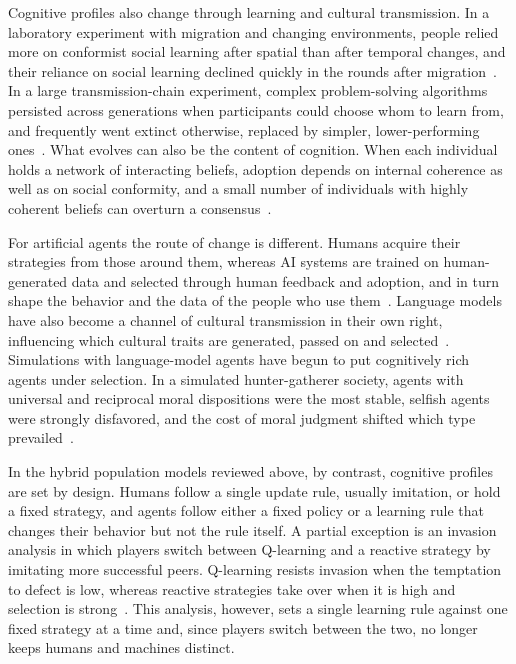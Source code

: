 Cognitive profiles also change through learning and cultural transmission. In a laboratory experiment with migration and changing environments, people relied more on conformist social learning after spatial than after temporal changes, and their reliance on social learning declined quickly in the rounds after migration~\cite{deffnerDynamicSocialLearning2020}. In a large transmission-chain experiment, complex problem-solving algorithms persisted across generations when participants could choose whom to learn from, and frequently went extinct otherwise, replaced by simpler, lower-performing ones~\cite{thompsonComplexCognitiveAlgorithms2022}. What evolves can also be the content of cognition. When each individual holds a network of interacting beliefs, adoption depends on internal coherence as well as on social conformity, and a small number of individuals with highly coherent beliefs can overturn a consensus~\cite{rodriguezCollectiveDynamicsBelief2016}.

For artificial agents the route of change is different. Humans acquire their strategies from those around them, whereas AI systems are trained on human-generated data and selected through human feedback and adoption, and in turn shape the behavior and the data of the people who use them~\cite{hanSocialPhysicsAge2026, pedreschiHumanAICoevolution2025}. Language models have also become a channel of cultural transmission in their own right, influencing which cultural traits are generated, passed on and selected~\cite{hanSocialPhysicsAge2026}. Simulations with language-model agents have begun to put cognitively rich agents under selection. In a simulated hunter-gatherer society, agents with universal and reciprocal moral dispositions were the most stable, selfish agents were strongly disfavored, and the cost of moral judgment shifted which type prevailed~\cite{zihengWhyAreWe2025}.

In the hybrid population models reviewed above, by contrast, cognitive profiles are set by design. Humans follow a single update rule, usually imitation, or hold a fixed strategy, and agents follow either a fixed policy or a learning rule that changes their behavior but not the rule itself. A partial exception is an invasion analysis in which players switch between Q-learning and a reactive strategy by imitating more successful peers. Q-learning resists invasion when the temptation to defect is low, whereas reactive strategies take over when it is high and selection is strong~\cite{quanHumanMachineCooperation2026}. This analysis, however, sets a single learning rule against one fixed strategy at a time and, since players switch between the two, no longer keeps humans and machines distinct.

